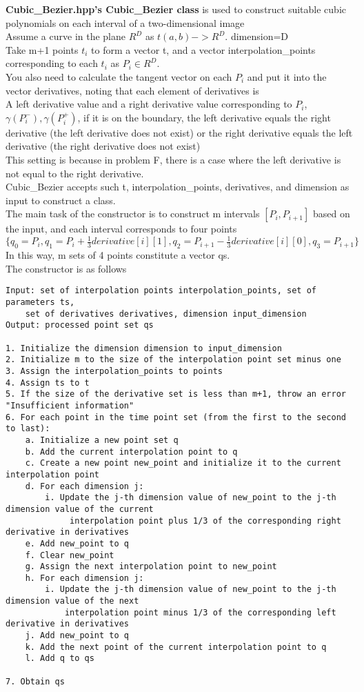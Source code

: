 \documentclass[a4paper]{article}
\begin{document}
\textbf{Cubic\_Bezier.hpp's Cubic\_Bezier class} is used to construct suitable cubic polynomials on each interval of a two-dimensional image \\
Assume a curve in the plane $R^D$ as $t (a,b)->R^D$.
dimension=D \\
Take m+1 points $t_i$ to form a vector t, and a vector interpolation\_points corresponding to each $t_i$ as $P_i \in R^D$. \\
You also need to calculate the tangent vector on each $P_i$ and put it into the vector derivatives, noting that each element of derivatives is \\
A left derivative value and a right derivative value corresponding to $P_i$, $\gamma(P_i^{-}),\gamma(P_i^{+})$, if it is on the boundary, the left derivative equals the right derivative (the left derivative does not exist) or the right derivative equals the left derivative (the right derivative does not exist) \\
This setting is because in problem F, there is a case where the left derivative is not equal to the right derivative. \\
Cubic\_Bezier accepts such t, interpolation\_points, derivatives, and dimension as input to construct a class. \\
The main task of the constructor is to construct m intervals $[P_i,P_{i+1}]$ based on the input, and each interval corresponds to four points $\{q_0=P_i,q_1=P_i+\frac{1}{3}derivative[i][1],q_2=P_{i+1}-\frac{1}{3}derivative[i][0],q_3=P_{i+1}\}$ \\
In this way, m sets of 4 points constitute a vector qs. \\
The constructor is as follows \\
\begin{verbatim}
Input: set of interpolation points interpolation_points, set of parameters ts, 
    set of derivatives derivatives, dimension input_dimension
Output: processed point set qs

1. Initialize the dimension dimension to input_dimension
2. Initialize m to the size of the interpolation point set minus one
3. Assign the interpolation_points to points
4. Assign ts to t
5. If the size of the derivative set is less than m+1, throw an error "Insufficient information"
6. For each point in the time point set (from the first to the second to last):
    a. Initialize a new point set q
    b. Add the current interpolation point to q
    c. Create a new point new_point and initialize it to the current interpolation point
    d. For each dimension j:
        i. Update the j-th dimension value of new_point to the j-th dimension value of the current
             interpolation point plus 1/3 of the corresponding right derivative in derivatives
    e. Add new_point to q
    f. Clear new_point
    g. Assign the next interpolation point to new_point
    h. For each dimension j:
        i. Update the j-th dimension value of new_point to the j-th dimension value of the next 
            interpolation point minus 1/3 of the corresponding left derivative in derivatives
    j. Add new_point to q
    k. Add the next point of the current interpolation point to q
    l. Add q to qs

7. Obtain qs
\end{verbatim}
\end{document}
